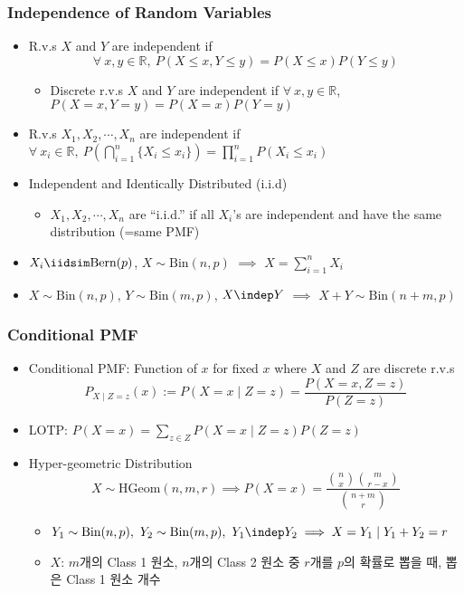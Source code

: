 \subsubsection*{Independence of Random Variables}
\begin{itemize}
    \item R.v.s $X$ and $Y$ are independent if
    \begin{equation}
        \forall~x,y\in\mathbb{R},~P(X\leq x,Y\leq y)=P(X\leq x)P(Y\leq y)
    \end{equation}
    \begin{itemize}
        \item Discrete r.v.s $X$ and $Y$ are independent if $\forall~x,y\in\mathbb{R}$, $P(X=x,Y=y)=P(X=x)P(Y=y)$
    \end{itemize}
    \item R.v.s $X_1,X_2,\cdots,X_n$ are independent if $\forall~x_i\in\mathbb{R},~P\left(\bigcap_{i=1}^n\{X_i\leq x_i\}\right)=\prod_{i=1}^nP(X_i\leq x_i)$
    \item Independent and Identically Distributed (i.i.d)
    \begin{itemize}
        \item $X_1,X_2,\cdots,X_n$ are ``i.i.d.'' if all $X_i$'s are independent and have the same distribution (=same PMF)
    \end{itemize}
    \item $X_i\iidsim\text{Bern}(p)$, $X\sim\text{Bin}(n,p)$ $\implies$ $X=\sum_{i=1}^nX_i$
    \item $X\sim\text{Bin}(n,p)$, $Y\sim\text{Bin}(m,p)$, $X\indep Y$ $\implies$ $X+Y\sim\text{Bin}(n+m,p)$
\end{itemize}

\subsubsection*{Conditional PMF}
\begin{itemize}
    \item Conditional PMF: Function of $x$ for fixed $x$ where $X$ and $Z$ are discrete r.v.s
    \begin{equation}
        P_{X\mid Z=z}(x):=P(X=x\mid Z=z)=\frac{P(X=x,Z=z)}{P(Z=z)}
    \end{equation}
    \item LOTP: $P(X=x)=\sum_{z\in Z}P(X=x\mid Z=z)P(Z=z)$
    \item Hyper-geometric Distribution
    \begin{equation}
        X\sim\text{HGeom}(n,m,r)\implies P(X=x)=\frac{\binom{n}{x}\binom{m}{r-x}}{\binom{n+m}{r}}
    \end{equation}
    \begin{itemize}
        \item $Y_1\sim\text{Bin}(n,p),~Y_2\sim\text{Bin}(m,p),~Y_1\indep Y_2\implies X=Y_1\mid Y_1+Y_2=r$
        \item $X$: $m$개의 Class 1 원소, $n$개의 Class 2 원소 중 $r$개를 $p$의 확률로 뽑을 때, 뽑은 Class 1 원소 개수
    \end{itemize}
\end{itemize}
